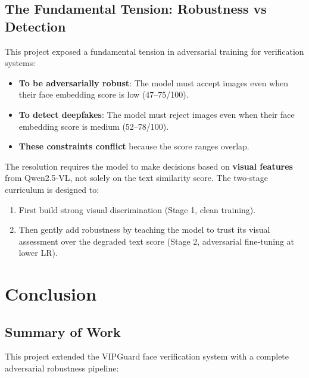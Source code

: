 \documentclass[12pt,a4paper]{article}
\begin{document}
\subsection{The Fundamental Tension: Robustness vs Detection}

This project exposed a fundamental tension in adversarial training for verification systems:

\begin{itemize}
    \item \textbf{To be adversarially robust}: The model must accept images even when their face embedding score is low (47--75/100).
    \item \textbf{To detect deepfakes}: The model must reject images even when their face embedding score is medium (52--78/100).
    \item \textbf{These constraints conflict} because the score ranges overlap.
\end{itemize}

The resolution requires the model to make decisions based on \textbf{visual features} from Qwen2.5-VL, not solely on the text similarity score. The two-stage curriculum is designed to:
\begin{enumerate}
    \item First build strong visual discrimination (Stage 1, clean training).
    \item Then gently add robustness by teaching the model to trust its visual assessment over the degraded text score (Stage 2, adversarial fine-tuning at lower LR).
\end{enumerate}

\section{Conclusion}

\subsection{Summary of Work}

This project extended the VIPGuard face verification system with a complete adversarial robustness pipeline:
\end{document}
